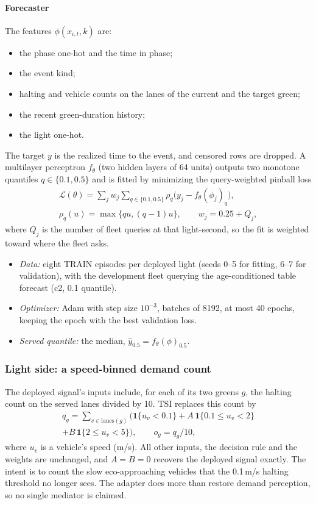 \paragraph{Forecaster} The features $\phi(x_{i,t},k)$ are:
\begin{itemize}\setlength\itemsep{0pt}
\item the phase one-hot and the time in phase;
\item the event kind;
\item halting and vehicle counts on the lanes of the current and the target green;
\item the recent green-duration history;
\item the light one-hot.
\end{itemize}
The target $y$ is the realized time to the event, and censored rows are dropped. A multilayer perceptron $f_\theta$ (two hidden layers of
64 units) outputs two monotone quantiles $q\in\{0.1,0.5\}$ and is fitted by minimizing the query-weighted pinball loss
\begin{gather}
\mathcal L(\theta)=\sum_j w_j\sum_{q\in\{0.1,0.5\}}\rho_q\big(y_j-f_\theta(\phi_j)_q\big),\\
\rho_q(u)=\max\{qu,(q-1)u\},\qquad w_j=0.25+Q_j,
\end{gather}
where $Q_j$ is the number of fleet queries at that light-second, so the fit is weighted toward where the fleet asks.
\begin{itemize}\setlength\itemsep{0pt}
\item \emph{Data:} eight TRAIN episodes per deployed light (seeds 0--5 for fitting, 6--7 for validation), with the development fleet
querying the age-conditioned table forecast (c2, 0.1 quantile).
\item \emph{Optimizer:} Adam with step size $10^{-3}$, batches of 8192, at most 40 epochs, keeping the epoch with the best validation loss.
\item \emph{Served quantile:} the median, $\hat y_{0.5}=f_\theta(\phi)_{0.5}$.
\end{itemize}
\subsubsection{Light side: a speed-binned demand count}
The deployed signal's inputs include, for each of its two greens $g$, the halting count on the served lanes divided by 10. TSI replaces this
count by
\begin{multline}
q_g=\sum_{v\in\mathrm{lanes}(g)}\Big(\mathbf{1}\{u_v<0.1\}+A\,\mathbf{1}\{0.1\le u_v<2\}\\+B\,\mathbf{1}\{2\le u_v<5\}\Big),\qquad o_g=q_g/10,
\end{multline}
where $u_v$ is a vehicle's speed (m/s). All other inputs, the decision rule and the weights are unchanged, and $A=B=0$ recovers the deployed
signal exactly. The intent is to count the slow eco-approaching vehicles that the 0.1\,m/s halting threshold no longer sees. The adapter
does more than restore demand perception, so no single mediator is claimed.
